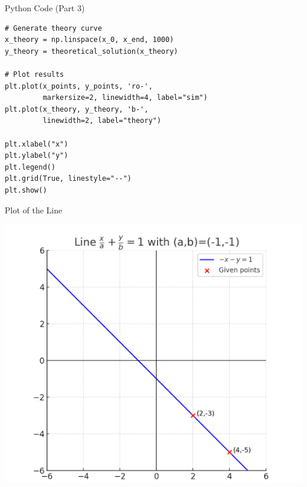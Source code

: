 \documentclass{beamer}
\begin{document}
\begin{frame}[fragile]{Python Code (Part 3)}
\lstset{language=Python}
\begin{lstlisting}
# Generate theory curve
x_theory = np.linspace(x_0, x_end, 1000)
y_theory = theoretical_solution(x_theory)

# Plot results
plt.plot(x_points, y_points, 'ro-', 
         markersize=2, linewidth=4, label="sim")
plt.plot(x_theory, y_theory, 'b-', 
         linewidth=2, label="theory")

plt.xlabel("x")
plt.ylabel("y")
plt.legend()
plt.grid(True, linestyle="--")
plt.show()
\end{lstlisting}
\end{frame}


\begin{frame}{Plot of the Line}
\begin{center}
\includegraphics[width=0.7\columnwidth]{figs/plot6.png}
\end{center}
\end{frame}
\end{document}
